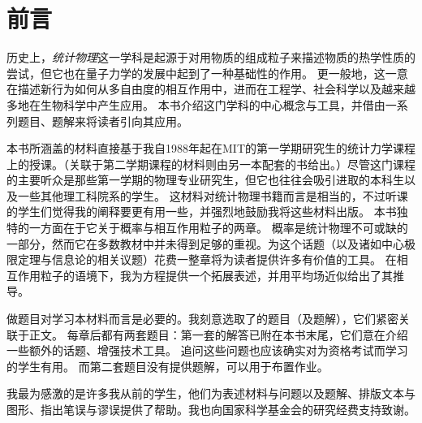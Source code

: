 \chapter{前言}

历史上，\textit{统计物理}这一学科是起源于对用物质的组成粒子来描述物质的热学性质的尝试，但它也在量子力学的发展中起到了一种基础性的作用。
更一般地，这一意在描述新行为如何从多自由度的相互作用中，进而在工程学、社会科学以及越来越多地在生物科学中产生应用。
本书介绍这门学科的中心概念与工具，并借由一系列题目、题解来将读者引向其应用。

本书所涵盖的材料直接基于我自1988年起在MIT的第一学期研究生的统计力学课程上的授课。（关联于第二学期课程的材料则由另一本配套的书给出。）尽管这门课程的主要听众是那些第一学期的物理专业研究生，但它也往往会吸引进取的本科生以及一些其他理工科院系的学生。
这材料对统计物理书籍而言是相当的，不过听课的学生们觉得我的阐释要更有用一些，并强烈地鼓励我将这些材料出版。
本书独特的一方面在于它关于概率与相互作用粒子的两章。
概率是统计物理不可或缺的一部分，然而它在多数教材中并未得到足够的重视。为这个话题（以及诸如中心极限定理与信息论的相关议题）花费一整章将为读者提供许多有价值的工具。
在相互作用粒子的语境下，我为{\vanDerWaals}方程提供一个拓展表述，并用平均场近似给出了其推导。

做题目对学习本材料而言是必要的。我刻意选取了的题目（及题解），它们紧密关联于正文。
每章后都有两套题目：第一套的解答已附在本书末尾，它们意在介绍一些额外的话题、增强技术工具。
追问这些问题也应该确实对为资格考试而学习的学生有用。
而第二套题目没有提供题解，可以用于布置作业。

我最为感激的是许多我从前的学生，他们为表述材料与问题以及题解、排版文本与图形、指出笔误与谬误提供了帮助。我也向国家科学基金会的研究经费支持致谢。